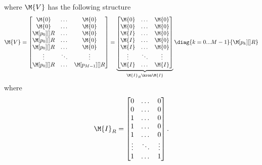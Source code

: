 %
where $\M{V}$ has the following structure
%
\begin{equation}
    \M{V}
    =
    \begin{bmatrix}
        \M{0}           &   \dots   &   \M{0} \\
        \M{0}           &   \dots   &   \M{0} \\
        \M[p_{0}][]{R}  &   \dots   &   \M{0} \\
        \M[p_{0}][]{R}  &   \dots   &   \M{0} \\
        \M[p_{0}][]{R}  &   \dots   &   \M{0} \\
        \vdots          &   \ddots  &   \vdots \\
        \M[p_{0}][]{R}  &   \dots   &   \M[p_{M-1}][]{R} \\
    \end{bmatrix}
    =
    \underbrace{
        \begin{bmatrix}
            \M{0}   &   \dots   &   \M{0} \\
            \M{0}   &   \dots   &   \M{0} \\
            \M{I}   &   \dots   &   \M{0} \\
            \M{I}   &   \dots   &   \M{0} \\
            \M{I}   &   \dots   &   \M{0} \\
            \vdots  &   \ddots  &   \vdots \\
            \M{I}   &   \dots   &   \M{I} \\
        \end{bmatrix}
    }_{\M{I}_R \kron \M{I}}
    \diag{k = 0...M-1}{ \M[p_{k}][]{R} }
\end{equation}
%
where
%
\begin{equation}
    \M{I}_R
    =
    \begin{bmatrix}
        0   &   \dots   &   0 \\
        0   &   \dots   &   0 \\
        1   &   \dots   &   0 \\
        1   &   \dots   &   0 \\
        1   &   \dots   &   0 \\
        \vdots  &   \ddots  &   \vdots \\
        1   &   \dots   &   1 \\
    \end{bmatrix}.
\end{equation}


